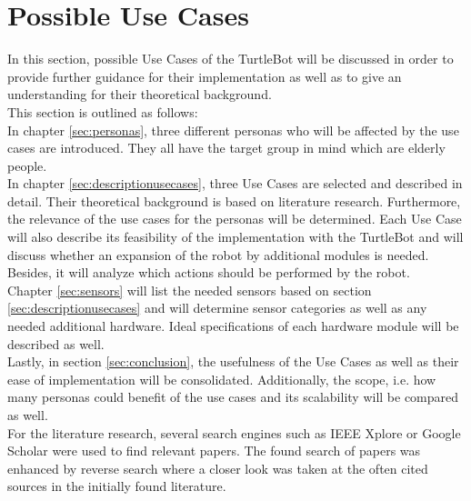 \documentclass[plainarticle,zihtitle,english,final,hyperref,utf8]{zihpub}
\begin{document}
\section{Possible Use Cases}
In this section, possible Use Cases of the TurtleBot will be discussed in order to provide further guidance for their implementation as well as to give an understanding for their theoretical background.\\
\newline
This section is outlined as follows:\\
\newline
In chapter \ref{sec:personas}, three different personas who will be affected by the use cases are introduced. They all have the target group in mind which are elderly people.\\
In chapter \ref{sec:descriptionusecases}, three Use Cases are selected and described in detail. Their theoretical background is based on literature research. Furthermore, the relevance of the use cases for the personas will be determined. Each Use Case will also describe its feasibility of the implementation with the TurtleBot and will discuss whether an expansion of the robot by additional modules is needed. Besides, it will analyze which actions should be performed by the robot.\\
Chapter \ref{sec:sensors} will list the needed sensors based on section \ref{sec:descriptionusecases} and will determine sensor categories as well as any needed additional hardware. Ideal specifications of each hardware module will be described as well.\\
Lastly, in section \ref{sec:conclusion}, the usefulness of the Use Cases as well as their ease of implementation will be consolidated. Additionally, the scope, i.e. how many personas could benefit of the use cases and its scalability will be compared as well.\\
\newline
For the literature research, several search engines such as IEEE Xplore or Google Scholar were used to find relevant papers. The found search of papers was enhanced by reverse search where a closer look was taken at the often cited sources in the initially found literature.
\end{document}
